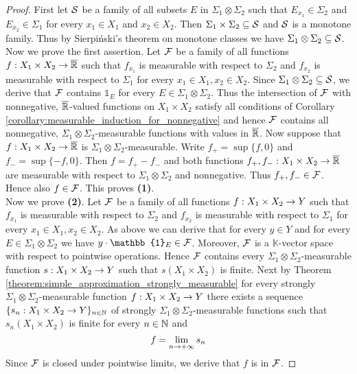 \begin{proof}
    First let ${\mathcal S}$ be a family of all subsets $E$ in $\Sigma_1\otimes \Sigma_2$ such that $E_{x_1}\in \Sigma_2$ and $E_{x_2}\in \Sigma_1$ for every $x_1\in X_1$ and $x_2\in X_2$. Then $\Sigma_1\times \Sigma_2\subseteq {\mathcal S}$ and ${\mathcal S}$ is a monotone family. Thus by Sierpiński's theorem on monotone classes we have $\Sigma_1\otimes \Sigma_2\subseteq {\mathcal S}$.\\
    Now we prove the first assertion. Let ${\mathcal F}$ be a family of all functions $f:X_1\times X_2\rightarrow \overline{{\mathbb R}}$ such that $f_{x_1}$ is measurable with respect to $\Sigma_2$ and $f_{x_2}$ is measurable with respect to $\Sigma_1$ for every $x_1\in X_1,x_2\in X_2$. Since $\Sigma_1\otimes \Sigma_2\subseteq {\mathcal S}$, we derive that ${\mathcal F}$ contains $\mathbb{1}_E$ for every $E\in \Sigma_1\otimes \Sigma_2$. Thus the intersection of ${\mathcal F}$ with nonnegative, $\overline{{\mathbb R}}$-valued functions on $X_1\times X_2$ satisfy all conditions of Corollary \ref{corollary:measurable_induction_for_nonnegative} and hence ${\mathcal F}$ contains all nonnegative, $\Sigma_1\otimes \Sigma_2$-measurable functions with values in $\overline{{\mathbb R}}$. Now suppose that $f:X_1\times X_2\rightarrow \overline{{\mathbb R}}$ is $\Sigma_1\otimes \Sigma_2$-measurable. Write $f_+ = \sup\{f, 0\}$ and $f_- = \sup\{-f, 0\}$. Then $f = f_+ - f_-$ and both functions $f_+,f_-:X_1\times X_2\rightarrow \overline{{\mathbb R}}$ are measurable with respect to $\Sigma_1\otimes \Sigma_2$ and nonnegative. Thus $f_+,f_-\in {\mathcal F}$. Hence also $f\in {\mathcal F}$. This proves \textbf{(1)}.\\
    Now we prove \textbf{(2)}. Let ${\mathcal F}$ be a family of all functions $f:X_1\times X_2\rightarrow Y$ such that $f_{x_1}$ is measurable with respect to $\Sigma_2$ and $f_{x_2}$ is measurable with respect to $\Sigma_1$ for every $x_1\in X_1,x_2\in X_2$. As above we can derive that for every $y\in Y$ and for every $E\in \Sigma_1\otimes \Sigma_2$ we have $y\cdot \mathbb{1}_E\in \cF$. Moreover, ${\mathcal F}$ is a $\mathbb{K}$-vector space with respect to pointwise operations. Hence ${\mathcal F}$ contains every $\Sigma_1\otimes \Sigma_2$-measurable function $s:X_1\times X_2\rightarrow Y$ such that $s(X_1\times X_2)$ is finite. Next by Theorem \ref{theorem:simple_approximation_strongly_measurable} for every strongly $\Sigma_1\otimes \Sigma_2$-measurable function $f:X_1\times X_2\rightarrow Y$ there exists a sequence $\{s_n:X_1\times X_2\rightarrow Y\}_{n\in {\mathbb N}}$ of strongly $\Sigma_1\otimes \Sigma_2$-measurable functions such that $s_n(X_1\times X_2)$ is finite for every $n\in {\mathbb N}$ and
    $$f = \lim_{n\rightarrow +\infty}s_n$$
    Since ${\mathcal F}$ is closed under pointwise limits, we derive that $f$ is in ${\mathcal F}$.
\end{proof}

